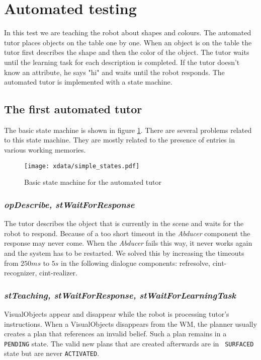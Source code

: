 \documentclass{article}
\begin{document}
\section{Automated testing}

In this test we are teaching the robot about shapes and colours. The automated
tutor places objects on the table one by one. When an object is on the table
the tutor first describes the shape and then the color of the object. The tutor
waits until the learning task for each description is completed. If the tutor
doesn't know an attribute, he says "hi" and waits until the robot responds.
The automated tutor is implemented with a state machine. 

\subsection{The first automated tutor}

The basic state machine is shown in figure \ref{fig:simpleStates}. There are
several problems related to this state machine. They are mostly related to the
presence of entries in various working memories.

\begin{figure}
\texttt{[image: xdata/simple\_states.pdf]}
\label{fig:simpleStates}
\caption{Basic state machine for the automated tutor}
\end{figure}

\subsubsection*{\em opDescribe, stWaitForResponse }

The tutor describes the object that is currently in the scene and waits for the
robot to respond. Because of a too short timeout in the {\em Abducer} component
the response may never come. When the {\em Abducer} fails this way, it never
works again and the system has to be restarted. We solved this by increasing
the timeouts from $250ms$ to $5s$ in the following dialogue components:
refresolve, cint-recognizer, cint-realizer.

\subsubsection*{\em stTeaching, stWaitForResponse, stWaitForLearningTask}

VisualObjects appear and disappear while the robot is processing tutor's
instructions. When a VisualObjects disappears from the WM, the planner usually
creates a plan that references an invalid belief. Such a plan remains in a {\tt
PENDING} state. The valid new plans that are created afterwards are in {\tt
SURFACED} state but are never {\tt ACTIVATED}.
\end{document}
